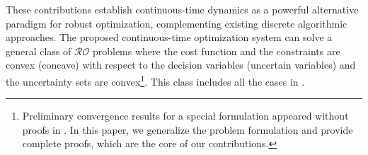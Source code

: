 \documentclass[journal,twoside,web]{ieeecolor}
\newcommand{\rev}[1]{\textcolor{revisionblue}{#1}}
\begin{document}





\rev{These contributions establish continuous-time dynamics as a powerful alternative paradigm for robust optimization, complementing existing discrete algorithmic approaches. The proposed continuous-time optimization system can solve a general class of $\mathcal{RO}$ problems where the cost function and the constraints are convex (concave) with respect to the decision variables (uncertain variables) and the uncertainty sets are convex}\footnote{Preliminary convergence results for a special formulation appeared without proofs in \cite{ebrahimi2019continuous}. In this paper, we generalize the problem formulation and provide complete proofs, which are the core of our contributions.}\rev{. This class includes all the cases in \cite[~Table 1]{gorissen20152}.}
\end{document}
